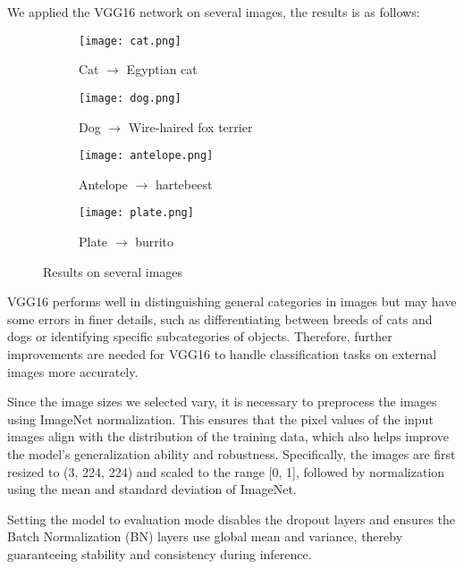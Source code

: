 \documentclass{rapportECL}
\begin{document}
\begin{description}
    We applied the VGG16 network on several images, the results is as follows:
    \begin{figure}[H]
        \centering
        \begin{subfigure}{0.45\linewidth}
            \centering
            \texttt{[image: cat.png]}
            \caption{Cat $\to$ Egyptian cat}
            \label{fig:cat}
        \end{subfigure}
        \begin{subfigure}{0.45\linewidth}
            \centering
            \texttt{[image: dog.png]}
            \caption{Dog $\to$ Wire-haired fox terrier}
            \label{fig:dog}
        \end{subfigure}
        \begin{subfigure}{0.45\linewidth}
            \centering
            \texttt{[image: antelope.png]}
            \caption{Antelope $\to$ hartebeest}
            \label{fig:antelope}
        \end{subfigure}
        \begin{subfigure}{0.45\linewidth}
            \centering
            \texttt{[image: plate.png]}
            \caption{Plate $\to$ burrito}
            \label{fig:plate}
        \end{subfigure}
        \caption{Results on several images}
        \label{fig:grid}
    \end{figure}
    VGG16 performs well in distinguishing general categories in images but may have some errors in finer details, such as differentiating between breeds of cats and dogs or identifying specific subcategories of objects. Therefore, further improvements are needed for VGG16 to handle classification tasks on external images more accurately.
    
    \begin{description}[leftmargin=0cm]
        \item[ImageNet Normalization:] Since the image sizes we selected vary, it is necessary to preprocess the images using ImageNet normalization. This ensures that the pixel values of the input images align with the distribution of the training data, which also helps improve the model's generalization ability and robustness. Specifically, the images are first resized to (3, 224, 224) and scaled to the range [0, 1], followed by normalization using the mean and standard deviation of ImageNet.
        \item[model.eval():] Setting the model to evaluation mode disables the dropout layers and ensures the Batch Normalization (BN) layers use global mean and variance, thereby guaranteeing stability and consistency during inference.
    \end{description}


\end{description}
\end{document}
